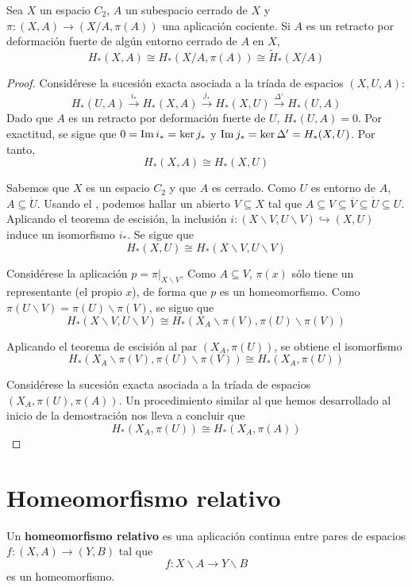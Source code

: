 \begin{theorem}
Sea $X$ un espacio $C_2$, $A$ un subespacio cerrado de $X$ y $\pi\colon (X,A)
\to (X/A,\pi(A))$ una aplicación cociente. Si $A$ es un retracto por
deformación fuerte de algún entorno cerrado de $A$ en $X$,
\[H_*(X,A) \cong H_*(X/A,\pi(A)) \cong \tilde{H}_*(X/A)\]
\end{theorem}

\begin{proof}
Considérese la sucesión exacta asociada a la tríada de espacios $(X,U,A)$:
\[H_*(U,A) \xrightarrow{i_*} H_*(X,A) \xrightarrow{j_*} H_*(X,U)
\xrightarrow{\Delta'} H_*(U,A)\]
Dado que $A$ es un retracto por deformación fuerte de $U$, $H_*(U,A)=0$. Por
exactitud, se sigue que $0=\operatorname{Im} i_*=\ker j_*$ y $\operatorname{Im} j_*=\ker \Delta'=
H_*(X,U)$. Por tanto,
\[H_*(X,A) \cong H_*(X,U)\]

Sabemos que $X$ es un espacio $C_2$ y que $A$ es cerrado. Como $U$ es
entorno de $A$, $A \subseteq \mathring U$. Usando el , podemos
hallar un abierto $V \subseteq X$ tal que $A \subseteq V \subseteq
\overline{V} \subseteq \mathring U \subseteq U$. Aplicando el teorema de
escisión, la inclusión $i\colon (X\backslash V,U\backslash V) \hookrightarrow
(X,U)$ induce un isomorfismo $i_*$. Se sigue que
\[H_*(X,U)\cong H_*(X\backslash V,U\backslash V)\]

Considérese la aplicación $p=\pi|_{X\backslash V}$. Como $A \subseteq V$,
$\pi(x)$ sólo tiene un representante (el propio $x$), de forma que $p$ es un
homeomorfismo. Como $\pi(U\backslash V)=\pi(U)\backslash \pi(V)$, se sigue que
\[H_*(X\backslash V,U\backslash V)\cong
H_*(X_A\backslash \pi(V),\pi(U)\backslash \pi(V))\]

Aplicando el teorema de escisión al par $(X_A,\pi(U))$, se obtiene el
isomorfismo
\[H_*(X_A\backslash \pi(V),\pi(U)\backslash \pi(V)) \cong H_*(X_A,\pi(U))\]

Considérese la sucesión exacta asociada a la tríada de espacios\\
$(X_A,\pi(U),\pi(A))$. Un procedimiento similar al que hemos desarrollado al
inicio de la demostración nos lleva a concluir que
\[H_*(X_A,\pi(U))\cong H_*(X_A,\pi(A))\]
\end{proof}

\section{Homeomorfismo relativo}
\begin{definition}
Un \textbf{homeomorfismo relativo} es una aplicación continua entre pares de
espacios $f\colon (X,A) \to (Y,B)$ tal que
\[f\colon X\backslash A \longrightarrow Y\backslash B\]
es un homeomorfismo.
\end{definition}

